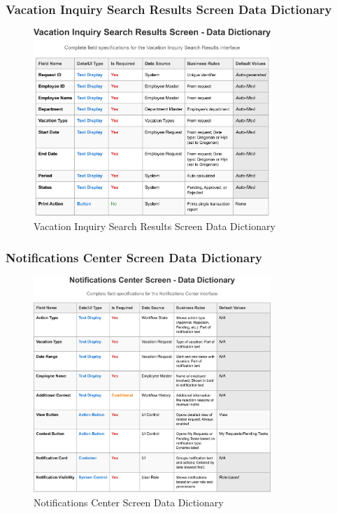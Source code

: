 \documentclass[12pt,a4paper]{article}
\begin{document}
\subsubsection{Vacation Inquiry Search Results Screen Data Dictionary}
\begin{figure}[H]
\centering
\includegraphics[width=0.8\textwidth]{Data-Dictionary/Screen-Data-Dictionaries/Vacation-Inquiry-Search-Results-Screen-Data-Dictionary/Vacation-Inquiry-Search-Results-Screen-Data-Dictionary-1.png}
\caption{Vacation Inquiry Search Results Screen Data Dictionary}
\label{fig:inquiry-search-results-data-dict}
\end{figure}

\subsubsection{Notifications Center Screen Data Dictionary}
\begin{figure}[H]
\centering
\includegraphics[width=0.8\textwidth]{Data-Dictionary/Screen-Data-Dictionaries/Notifications-Center-Screen-Data-Dictionary/Notifications-Center-Screen-Data-Dictionary-1.png}
\caption{Notifications Center Screen Data Dictionary}
\label{fig:notifications-center-data-dict}
\end{figure}
\end{document}
